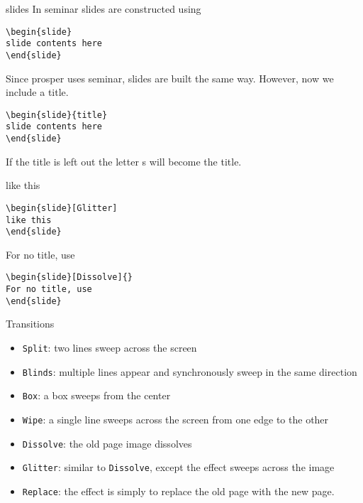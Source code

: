 \documentclass[ps,eliz,slideColor,nocolorBG,accumulate]{prosper}
\begin{document}
\begin{slide}[Glitter]{slides}
In seminar slides are constructed using
\begin{verbatim}
\begin{slide}
slide contents here
\end{slide}
\end{verbatim}
Since prosper uses seminar, slides are built the same way.  However, now we include a title.
\begin{verbatim}
\begin{slide}{title}
slide contents here
\end{slide}
\end{verbatim}
If the title is left out the letter s will become the title.
\end{slide}

\begin{slide}[Glitter]
like this
\begin{verbatim}
\begin{slide}[Glitter]
like this
\end{slide}
\end{verbatim}
\end{slide}

\begin{slide}[Dissolve]{}
For no title, use
\begin{verbatim}
\begin{slide}[Dissolve]{}
For no title, use
\end{slide}
\end{verbatim}

\end{slide}

\begin{slide}[Wipe]{Transitions}
\begin{itemize}
\item \texttt{Split}: two lines sweep across the screen 
\item \texttt{Blinds}: multiple lines appear and synchronously sweep in the same direction 
\item \texttt{Box}: a box sweeps from the center
\item \texttt{Wipe}: a single line sweeps across the screen from one
  edge to the other
\item \texttt{Dissolve}: the old page image dissolves 
\item \texttt{Glitter}: similar to \texttt{Dissolve}, except the
  effect sweeps across the image 
\item \texttt{Replace}: the effect is simply to replace the old page
  with the new page.
\end{itemize}      
\end{slide}
\end{document}
